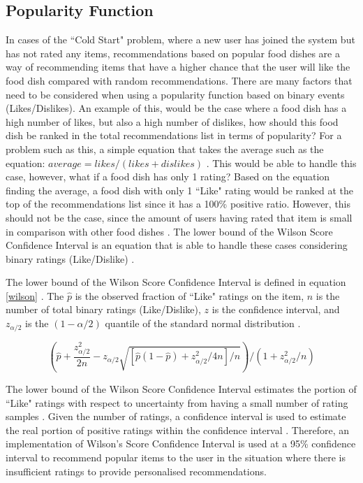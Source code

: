 \subsection{Popularity Function} \label{subsection:popularity}
In cases of the ``Cold Start" problem, where a new user has joined the system but has not rated any items, recommendations based on popular food dishes are a way of recommending items that have a higher chance that the user will like the food dish compared with random recommendations. There are many factors that need to be considered when using a popularity function based on binary events (Likes/Dislikes). An example of this, would be the case where a food dish has a high number of likes, but also a high number of dislikes, how should this food dish be ranked in the total recommendations list in terms of popularity? For a problem such as this, a simple equation that takes the average such as the equation: $average= likes/(likes+dislikes)$ \cite{popularity}. This would be able to handle this case, however, what if a food dish has only 1 rating? Based on the equation finding the average, a food dish with only 1 ``Like" rating would be ranked at the top of the recommendations list since it has a 100\% positive ratio. However, this should not be the case, since the amount of users having rated that item is small in comparison with other food dishes \cite{popularity}. The lower bound of the Wilson Score Confidence Interval is an equation that is able to handle these cases considering binary ratings (Like/Dislike) \cite{wilson1927probable}. 

The lower bound of the Wilson Score Confidence Interval is defined in equation \ref{wilson}  \cite{wilson1927probable, popularity}. The $\hat{p}$ is the observed fraction of ``Like" ratings on the item, $n$ is the number of total binary ratings (Like/Dislike), $z$ is the confidence interval, and $z_{\alpha/2}$ is the $(1-\alpha/2)$ quantile of the standard normal distribution \cite{popularity}.    

\begin{equation} \label{wilson}
\left(\hat{p} + \frac{z^2_{\alpha/2}}{2n} - z_{\alpha/2} \sqrt{[\hat{p}(1-\hat{p}) + z^2_{\alpha/2}/4n]/n}\right)/(1 + z^2_{\alpha/2}/n)
\end{equation}

The lower bound of the Wilson Score Confidence Interval estimates the portion of ``Like" ratings with respect to uncertainty from having a small number of rating samples \cite{popularity}. Given the number of ratings, a confidence interval is used to estimate the real portion of positive ratings within the confidence interval \cite{popularity}. Therefore, an implementation of Wilson's Score Confidence Interval is used at a 95\% confidence interval to recommend popular items to the user in the situation where there is insufficient ratings to provide personalised recommendations. 

